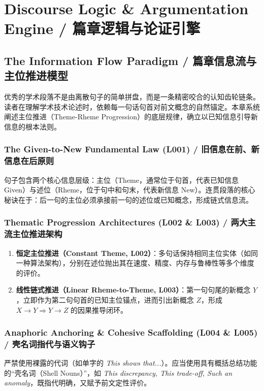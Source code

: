 \part{Discourse Logic \& Argumentation Engine / 篇章逻辑与论证引擎}\label{part:discourse}

\chapter{The Information Flow Paradigm / 篇章信息流与主位推进模型}\label{ch:infoflow}
优秀的学术段落不是由离散句子的简单拼盘，而是一条精密咬合的认知齿轮链条。读者在理解学术技术论述时，依赖每一句话句首对前文概念的自然锚定。本章系统阐述主位推进（Theme-Rheme Progression）的底层规律，确立以已知信息引导新信息的根本法则。

\section{The Given-to-New Fundamental Law (L001) / 旧信息在前、新信息在后原则}
句子包含两个核心信息层级：主位（Theme，通常位于句首，代表已知信息 Given）与述位（Rheme，位于句中和句末，代表新信息 New）。连贯段落的核心秘诀在于：后一句的主位必须承接前一句的述位或已知概念，形成链式信息流。

\section{Thematic Progression Architectures (L002 \& L003) / 两大主流主位推进架构}
\begin{enumerate}[label=\textbf{\color{AcadNavy}\arabic*.}, leftmargin=2em]
  \item \textbf{恒定主位推进（Constant Theme, L002）}：多句话保持相同主位实体（如同一种算法架构），分别在述位抛出其在速度、精度、内存与鲁棒性等多个维度的评价。
  \item \textbf{线性链式推进（Linear Rheme-to-Theme, L003）}：第一句句尾的新概念 $Y$，立即作为第二句句首的已知主位锚点，进而引出新概念 $Z$，形成 $X \to Y \Rightarrow Y \to Z$ 的因果推导闭环。
\end{enumerate}

\section{Anaphoric Anchoring \& Cohesive Scaffolding (L004 \& L005) / 壳名词指代与语义钩子}
严禁使用裸露的代词（如单字的 \textit{This shows that...}）。应当使用具有概括总结功能的“壳名词（Shell Nouns）”，如 \textit{This discrepancy, This trade-off, Such an anomaly}，既指代明确，又赋予前文定性评价。

